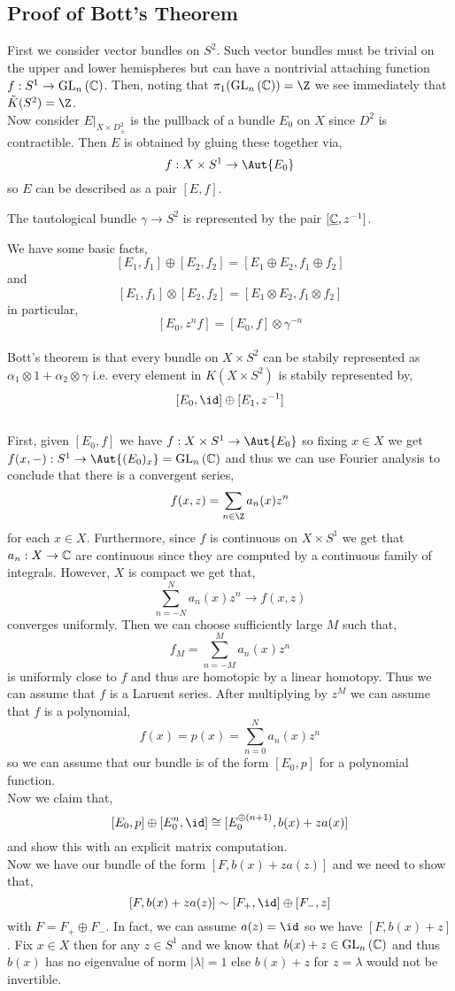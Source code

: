 \documentclass[12pt]{extarticle}
\newcommand{\GL}[2]{\mathrm{GL}_{#1} \left( #2 \right)}
\begin{document}
\subsection{Proof of Bott's Theorem}

First we consider vector bundles on $S^2$. Such vector bundles must be trivial on the upper and lower hemispheres but can have a nontrivial attaching function $f : S^1 \to \GL{n}{\C}$.  Then, noting that $\pi_1(\GL{n}{\C}) = \Z$  we see immediately that $\tilde{K}(S^2) = \Z$. 
\bigskip\\
Now consider $E |_{X \times D^2_{\pm}}$ is the pullback of a bundle $E_0$ on $X$ since $D^2$ is contractible. Then $E$ is obtained by gluing these together via,
\[ f : X \times S^1 \to \Aut{E_0} \]
so $E$ can be described as a pair $[E, f]$. 
\begin{example}
The tautological bundle $\gamma \to S^2$ is represented by the pair $[\underline{\mathbb{C}}, z^{-1}]$. 
\end{example}
\noindent
We have some basic facts,
\[ [E_1, f_1] \oplus [E_2, f_2] = [E_1 \oplus E_2, f_1 \oplus f_2] \]
and
\[ [E_1, f_1] \otimes [E_2, f_2] = [E_1 \otimes E_2, f_1 \otimes f_2] \]
in particular,
\[ [E_0, z^n f] = [E_0, f] \otimes \gamma^{-n} \]
\bigskip\\
Bott's theorem is that every bundle on $X \times S^2$ can be stabily represented as $\alpha_1 \otimes 1 + \alpha_2 \otimes \gamma$ i.e. every element in $K(X \times S^2)$ is stabily represented by,
\[ [E_0, \id] \oplus [E_1, z^{-1} ] \]
\bigskip\\
First, given $[E_0, f]$ we have $f : X \times S^1 \to \Aut{E_0}$ so fixing $x \in X$ we get $f(x, -) : S^1 \to \Aut{(E_0)_x} = \GL{n}{\C}$ and thus we can use Fourier analysis to conclude that there is a convergent series,
\[ f(x, z) = \sum_{n \in \Z} a_n(x) z^n \] 
for each $x \in X$. Furthermore, since $f$ is continuous on $X \times S^1$ we get that $a_n : X \to \mathbb{C}$ are continuous since they are computed by a continuous family of integrals. However, $X$ is compact we get that,
\[ \sum_{n = -N}^N a_n(x) z^n \to f(x, z) \]
converges uniformly. Then we can choose sufficiently large $M$ such that,
\[ f_M = \sum_{n = - M}^M a_n(x) z^n \]
is uniformly close to $f$ and thus are homotopic by a linear homotopy. Thus we can assume that $f$ is a Laruent series. After multiplying by $z^M$ we can assume that $f$ is a polynomial,
\[ f(x) = p(x) = \sum_{n = 0}^N a_n(x) z^n \]
so we can assume that our bundle is of the form $[E_0, p]$ for a polynomial function. 
\bigskip\\
Now we claim that,
\[ [E_0, p] \oplus [E_0^n, \id] \cong [E_0^{\oplus (n+1)}, b(x) + z a(x)] \]
and show this with an explicit matrix computation.
\bigskip\\
Now we have our bundle of the form $[F, b(x) + z a(z)]$ and we need to show that,
\[ [F, b(x) + z a(z)] \sim [F_{+}, \id] \oplus [F_{-}, z ] \]
with $F = F_{+} \oplus F_{-}$. In fact, we can assume $a(z) = \id$ so we have $[F, b(x) + z]$. Fix $x \in X$ then for any $z \in S^1$ and we know that $b(x) + z \in \GL{n}{\C}$ and thus $b(x)$ has no eigenvalue of norm $|\lambda| = 1$ else $b(x) + z$ for $z = \lambda$ would not be invertible. 
\end{document}
